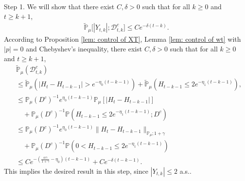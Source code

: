 \documentclass[12pt,a4paper]{amsart}
\theoremstyle{plain}
\theoremstyle{definition}
\numberwithin{equation}{section}
\begin{document}
    Step 1. We will show that there exist $C,\delta >0$ such that for all $k \geq 0$ and $t\geq k+1$,
\begin{equation}\begin{split}
\label{thm121}
    \mathbb{\tilde{P}}_{\mu}\big[|Y_{t,k}|;\mathcal{D}^c_{t,k}\big]
    \leq C e^{-\delta (t-k)}.
\end{split}\end{equation}
   According to 
    Proposition \ref{lem: control of XT}, Lemma \ref{lem: control of wt} with $|p|=0$ and Chebyshev's inequality, there exist $C, \delta>0$ such that for all $k \geq 0$ and $t\geq k+1$,
\begin{equation}\begin{split}
\label{eq: prob of Dtkc}
    &\mathbb{\tilde{P}}_{\mu}(\mathcal{D}_{t,k}^c)
    \\&\leq \mathbb{\tilde{P}}_{\mu}(|H_t-H_{t-k-1}| > e^{-\eta_0 (t-k-1)})+\mathbb{\tilde{P}}_{\mu}(H_{t-k-1}\leq 2e^{-\eta_1(t-k-1)}),
    \\&\leq \mathbb{P}_{\mu}(D^c)^{-1}e^{\eta_0(t-k-1)}\mathbb{P}_{\mu}[|H_t-H_{t-k-1}|]
    \\&\quad +\mathbb{P}_{\mu}(D^c)^{-1} \mathbb P(H_{t-k-1}\leq 2e^{-\eta_1(t-k-1)}; D^c)
    \\&\leq \mathbb{P}_{\mu}(D^c)^{-1}  e^{\eta_0(t-k-1)}\|H_t - H_{t-k-1}\|_{\mathbb P_\mu; 1+\gamma}
    \\&\quad + \mathbb{P}_{\mu}(D^c)^{-1} \mathbb P(0<H_{t-k-1}\leq 2e^{-\eta_1(t-k-1)})
    \\&\leq C e^{-(\frac{\alpha \gamma}{1+\gamma} - \eta_0)(t-k-1)}+C e^{-\delta(t-k-1)}.
\end{split}\end{equation}
    This implies the desired result in this step, since $|Y_{t,k}| \leq 2$ a.s..
\end{document}
